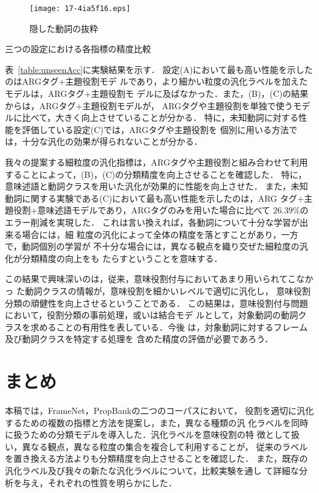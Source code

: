\documentclass[japanese]{jnlp_1.4}
\begin{document}
\begin{figure}[b]
\begin{center}
\texttt{[image: 17-4ia5f16.eps]}
\end{center}
\caption{隠した動詞の抜粋}
\label{unseenList} 
\end{figure}

\begin{table}[b]
\caption{三つの設定における各指標の精度比較}
\label{table:unseenAcc} 

\end{table}

表~\ref{table:unseenAcc}に実験結果を示す．
設定(A)において最も高い性能を示したのはARGタグ+主題役割モデ
ルであり，より細かい粒度の汎化ラベルを加えたモデルは，ARGタグ+主題役割モ
デルに及ばなかった．また，(B)，(C)の結果からは，ARGタグ+主題役割モデルが，
ARGタグや主題役割を単独で使うモデルに比べて，大きく向上させていることが分かる．
特に，未知動詞に対する性能を評価している設定(C)では，ARGタグや主題役割を
個別に用いる方法では，十分な汎化の効果が得られないことが分かる．

我々の提案する細粒度の汎化指標は，ARGタグや主題役割と組み合わせて利用
することによって，(B)，(C)の分類精度を向上させることを確認した．
特に，意味述語と動詞クラスを用いた汎化が効果的に性能を向上させた．
また，未知動詞に関する実験である(C)において最も高い性能を示したのは，ARG
タグ+主題役割+意味述語モデルであり，ARGタグのみを用いた場合に比べて
$26.39$\%のエラー削減を実現した．
これは言い換えれば，各動詞について十分な学習が出来る場合には，細
粒度の汎化によって全体の精度を落とすことがあり，一方で，動詞個別の学習が
不十分な場合には，異なる観点を織り交ぜた細粒度の汎化が分類精度の向上をも
たらすということを意味する．

この結果で興味深いのは，従来，意味役割付与においてあまり用いられてこなかっ
た動詞クラスの情報が，意味役割を細かいレベルで適切に汎化し，
意味役割分類の頑健性を向上させるということである．
この結果は，意味役割付与問題において，役割分類の事前処理，或いは結合モデ
ルとして，対象動詞の動詞クラスを求めることの有用性を表している．今後
は，対象動詞に対するフレーム及び動詞クラスを特定する処理を
含めた精度の評価が必要であろう．



\section{まとめ}

本稿では，FrameNet，PropBankの二つのコーパスにおいて，
役割を適切に汎化するための複数の指標と方法を提案し，また，異なる種類の汎
化ラベルを同時に扱うための分類モデルを導入した．汎化ラベルを意味役割の特
徴として扱い，異なる観点，異なる粒度の集合を複合して利用することが，
従来のラベルを置き換える方法よりも分類精度を向上させることを確認した．
また，既存の汎化ラベル及び我々の新たな汎化ラベルについて，比較実験を通し
て詳細な分析を与え，それぞれの性質を明らかにした．
\end{document}
